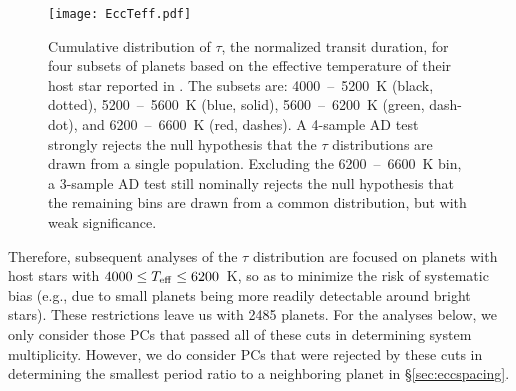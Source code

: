 \documentclass{aastex62}
\begin{document}
\begin{figure}
    \centering
    \texttt{[image: EccTeff.pdf]}
    \caption{Cumulative distribution of $\tau$, the normalized transit duration, for four subsets of planets based on the effective temperature of their host star reported in \citet{Berger:2020a}.  The subsets are: 4000~--~5200~K (black, dotted), 5200~--~5600~K (blue, solid), 5600~--~6200~K (green, dash-dot), and 6200~--~6600~K (red, dashes).  A 4-sample AD test strongly rejects the null hypothesis that the $\tau$ distributions are drawn from a single population.  Excluding the 6200~--~6600~K bin,  a 3-sample AD test still nominally rejects the null hypothesis that the remaining bins are drawn from a common distribution, but with weak significance.}
    \label{fig:EccTeff}
\end{figure}

Therefore, subsequent analyses of the $\tau$ distribution are focused on planets with host stars with $4000 \le T_{\rm eff} \le 6200$~K,
so as to minimize the risk of systematic bias (e.g., due to small planets being more readily detectable around bright stars). These restrictions leave us with 2485 planets. For the analyses below, we only consider those PCs that passed all of these cuts in determining system multiplicity. However, we do consider PCs that were rejected by these cuts in determining the smallest period ratio to a neighboring planet in \S\ref{sec:eccspacing}. 


%
\end{document}

